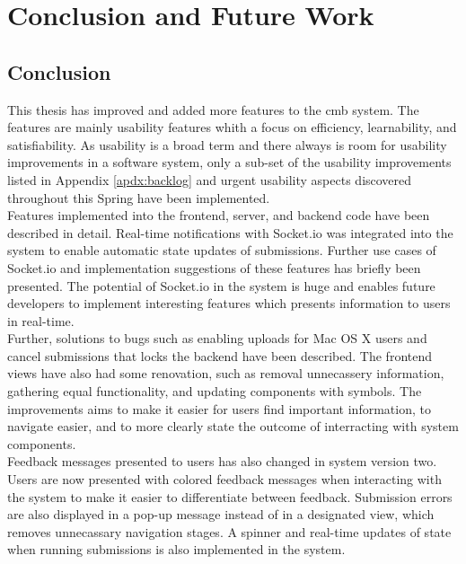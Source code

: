 \chapter{Conclusion and Future Work}
\label{ch:conclusion}

\section{Conclusion}
This thesis has improved and added more features to the \gls{cmb} system. The features are mainly usability features whith a focus on efficiency, learnability, and satisfiability. As usability is a broad term and there always is room for usability improvements in a software system, only a sub-set of the usability improvements listed in Appendix \ref{apdx:backlog} and urgent usability aspects discovered throughout this Spring have been implemented. \\

Features implemented into the frontend, server, and backend code have been described in detail. Real-time notifications with Socket.io was integrated into the system to enable automatic state updates of submissions.  Further use cases of Socket.io and implementation suggestions of these features has briefly been presented. The potential of Socket.io in the system is huge and enables future developers to implement interesting features which presents information to users in real-time. \\

Further, solutions to bugs such as enabling uploads for Mac OS X users and cancel submissions that locks the backend have been described. The frontend views have also had some renovation, such as removal unnecassery information, gathering equal functionality, and updating components with symbols. The improvements aims to make it easier for users find important information, to navigate easier, and to more clearly state the outcome of interracting with system components. \\

Feedback messages presented to users has also changed in system version two. Users are now presented with colored feedback messages when interacting with the system to make it easier to differentiate between feedback. Submission errors are also displayed in a pop-up message instead of in a designated view, which removes unnecassary navigation stages. A spinner and real-time updates of state when running submissions is also implemented in the system. \\

